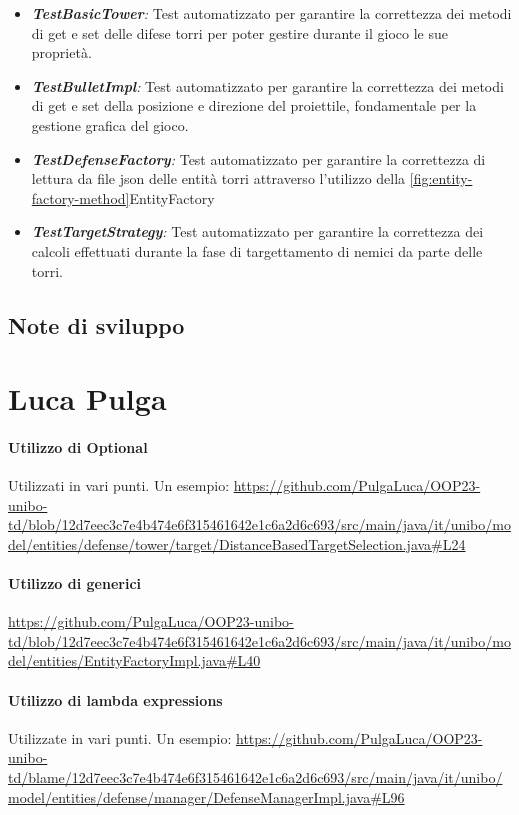 \documentclass[a4paper,12pt]{report}
\begin{document}
\begin{itemize}
    \item \textit{\textbf{TestBasicTower}:} Test automatizzato per garantire la correttezza dei metodi di get e set delle difese torri per poter gestire durante il gioco le sue proprietà.
    \item \textit{\textbf{TestBulletImpl}:} Test automatizzato per garantire la correttezza dei metodi di get e set della posizione e direzione del proiettile, fondamentale per la gestione grafica del gioco.
    \item \textit{\textbf{TestDefenseFactory}:} Test automatizzato per garantire la correttezza di lettura da file json delle entità torri attraverso l'utilizzo della \ref{fig:entity-factory-method}EntityFactory
    \item \textit{\textbf{TestTargetStrategy}:} Test automatizzato per garantire la correttezza dei calcoli effettuati durante la fase di targettamento di nemici da parte delle torri.
\end{itemize}

\section{Note di sviluppo}
\chapter{Luca Pulga}

\subsubsection{Utilizzo di Optional}
Utilizzati in vari punti. Un esempio: 
\url{https://github.com/PulgaLuca/OOP23-unibo-td/blob/12d7eec3c7e4b474e6f315461642e1c6a2d6c693/src/main/java/it/unibo/model/entities/defense/tower/target/DistanceBasedTargetSelection.java#L24}

\subsubsection{Utilizzo di generici}
\url{https://github.com/PulgaLuca/OOP23-unibo-td/blob/12d7eec3c7e4b474e6f315461642e1c6a2d6c693/src/main/java/it/unibo/model/entities/EntityFactoryImpl.java#L40}

\subsubsection{Utilizzo di lambda expressions}
Utilizzate in vari punti. Un esempio:  
\url{https://github.com/PulgaLuca/OOP23-unibo-td/blame/12d7eec3c7e4b474e6f315461642e1c6a2d6c693/src/main/java/it/unibo/model/entities/defense/manager/DefenseManagerImpl.java#L96}
\end{document}
